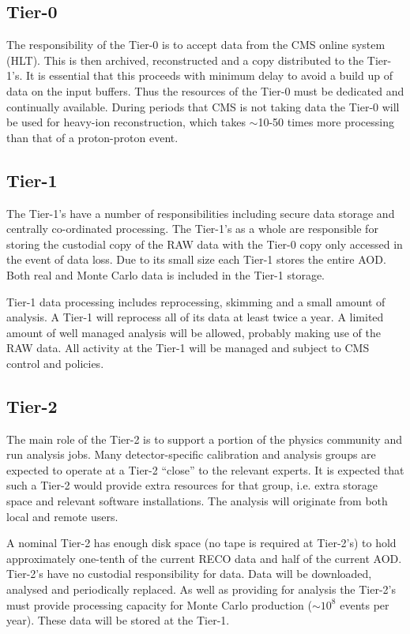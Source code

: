 \subsection{Tier-0}
The responsibility of the Tier-0 is to accept data from the CMS online system (HLT). This is then archived, reconstructed and a copy distributed to the Tier-1's. It is essential that this proceeds with minimum delay to avoid a build up of data on the input buffers. Thus the resources of the Tier-0 must be dedicated and continually available. During periods that CMS is not taking data the Tier-0 will be used for heavy-ion reconstruction, which takes $\sim$10-50 times more processing than that of a proton-proton event. %

\subsection{Tier-1}
The Tier-1's have a number of responsibilities including secure data storage and centrally co-ordinated processing. The Tier-1's as a whole are responsible for storing the custodial copy of the RAW data with the Tier-0 copy only accessed in the event of data loss. Due to its small size each Tier-1 stores the entire AOD. Both real and Monte Carlo data is included in the Tier-1 storage.

Tier-1 data processing includes reprocessing, skimming and a small amount of analysis. A Tier-1 will reprocess all of its data at least twice a year. A limited amount of well managed analysis will be allowed, probably making use of the RAW data. All activity at the Tier-1 will be managed and subject to CMS control and policies.

\subsection{Tier-2}
The main role of the Tier-2 is to support a portion of the physics community and run analysis jobs. Many detector-specific calibration and analysis groups are expected to operate at a Tier-2 ``close'' to the relevant experts. It is expected that such a Tier-2 would provide extra resources for that group, i.e. extra storage space and relevant software installations. The analysis will originate from both local and remote users. 

A nominal Tier-2 has enough disk space (no tape is required at Tier-2's) to hold approximately one-tenth of the current RECO data and half of the current AOD. Tier-2's have no custodial responsibility for data. Data will be downloaded, analysed and periodically replaced. As well as providing for analysis the Tier-2's must provide processing capacity for Monte Carlo production ($\sim10^{8}$ events per year). These data will be stored at the Tier-1.

